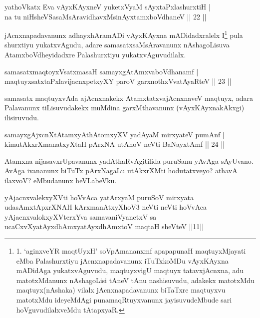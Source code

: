 \begin{shl}
yathoVkatx Eva vAyxKAyxneV yuketxVyaM sAyxtaPxlashurxtiH |\\
na tu niHsheVSasaMsAravidhavxMsinAyxtamxboVdhaneV \hfill || 22 ||
\end{shl}

\begin{artha}
jAcnxnapadavanunx adhayxhAramADi vAyxKAyxna mADidadxralelx I\footnote{1. `aginxveYR maqtUyxH' soV\s pAmananxmf apapapunaH maqtuyxMjayati eMba Palashurxtiyu jAcnxnapadavanunx iTuTxkoMDu vAyxKAyxna mADidAga yukatxvAguvudu, maqtuyxvigU maqtuyx tatavxjAcnxna, adu matotxMdanunx nAshagoLisi tAneV tAnu nashisuvudu, adakekx matotxMdu maqtuyx(nAshaka) vilalx jAcnxnapadavanunx biTaTxre maqtuyxvu matotxMdu ideyeMdAgi punamaqRtuyxvanunx jayisuvudeMbude sari hoVguvudilalxveMdu tAtapxyaR.} pula shurxtiyu yukatxvAgudu, adare samasatxsaMsAravanunx nAshagoLisuva AtamxboVdheyidadxre Palashurxtiyu yukatxvAguvudilalx.
\end{artha}


\begin{shl}
samasatxmaqtoyxVsatxmasaH samayxgAtAmxvaboVdhanamf |\\
maqtuyxsatxtaPxlavijacnxpetxyXY paroV garxnothxV\s vatAyaRteV \hfill || 23 ||
\end{shl}

\begin{artha}
samasatx maqtuyxvAda ajAcnxnakekx AtamxtatxvajAcnxnaveV maqtuyx, adara Palavanunx tiLisuvudakekx muMdina garxMthavanunx (vAyxKAyxnakAkxgi) ilisiruvudu.
\end{artha}


\begin{shl}
samayxgAjxcnXtAtamxyAthAtomxyXV yadA\s yaM mirxyateV pumAnf |\\
kimutAkxrXmanatxyXtaH pArxNA utAhoV neVti BaNayxtAmf \hfill || 24 ||
\end{shl}

\begin{artha}
Atamxna nijasavxrUpavanunx yadAthaRvAgitilida puruSanu yAvAga sAyUvano. AvAga ivananunx 
biTuTx pArxNagaLu utAkxrXMti hodutatxveyo? athavA ilaxvoV? eMbudanunx heVLabeVku.
\end{artha}


\begin{shl}
yAjacnxvalekxyXVti hoVvAca yatArxyaM puruSoV mirxyata udasAmxtApxrXNAH kArxmanAtxyXhoV3 neVti neVti hoVvAca yAjacnxvalokxyXV\s terxYva samavaniVyanetxV sa ucaCxvXyatAyxdhAmxyatAyxdhAmxtoV maqtaH sheVteV ||11||
\end{shl}

